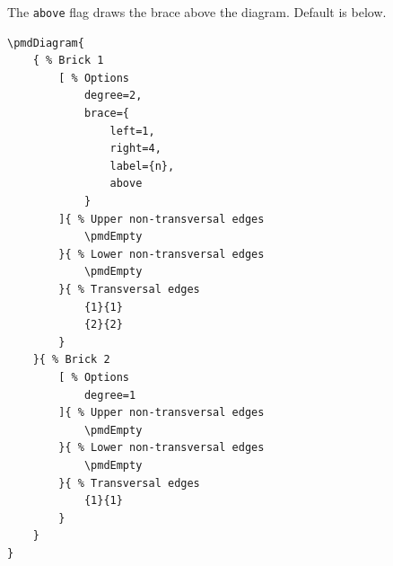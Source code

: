 \documentclass{ltxdoc}
\begin{document}
The \texttt{above} flag draws the brace above the diagram. Default is below.
\begin{center}
    \begin{minipage}{\dimexpr0.85\textwidth-2\fboxrule-2\fboxsep\relax}
        \begin{minipage}[c]{0.4\linewidth}
\begin{verbatim}
\pmdDiagram{
    { % Brick 1
        [ % Options
            degree=2,
            brace={
                left=1,
                right=4,
                label={n},
                above
            }
        ]{ % Upper non-transversal edges
            \pmdEmpty
        }{ % Lower non-transversal edges
            \pmdEmpty
        }{ % Transversal edges
            {1}{1}
            {2}{2}
        }
    }{ % Brick 2
        [ % Options
            degree=1
        ]{ % Upper non-transversal edges
            \pmdEmpty
        }{ % Lower non-transversal edges
            \pmdEmpty
        }{ % Transversal edges
            {1}{1}
        }
    }
}
\end{verbatim}
        \end{minipage}
        \hfill
        \begin{minipage}[c]{0.4\linewidth}
        \end{minipage}
    \end{minipage}%
\end{center}
\begin{center}
\end{center}
\end{document}
